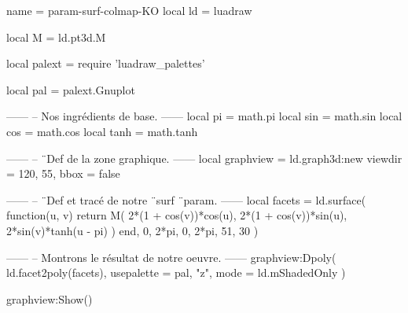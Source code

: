 \documentclass[border = 3pt]{standalone}
\begin{document}
\begin{luadraw*}{name = param-surf-colmap-KO}
local ld = luadraw

local M = ld.pt3d.M

local palext = require 'luadraw_palettes'

local pal = palext.Gnuplot

------
-- Nos ingrédients de base.
------
local pi   = math.pi
local sin  = math.sin
local cos  = math.cos
local tanh = math.tanh

------
-- ¨Def de la zone graphique.
------
local graphview = ld.graph3d:new{
  viewdir = {120, 55},
  bbox    = false
}

------
-- ¨Def et tracé de notre ¨surf ¨param.
------
local facets = ld.surface(
  function(u, v)
    return M(
      2*(1 + cos(v))*cos(u),
      2*(1 + cos(v))*sin(u),
      2*sin(v)*tanh(u - pi)
    )
  end,
  0, 2*pi, 0,  2*pi,
  {51, 30}
)

------
-- Montrons le résultat de notre oeuvre.
------
graphview:Dpoly(
  ld.facet2poly(facets),
  {
    usepalette = {pal, "z"},
    mode       = ld.mShadedOnly
  }
)

graphview:Show()
\end{luadraw*}
\end{document}
